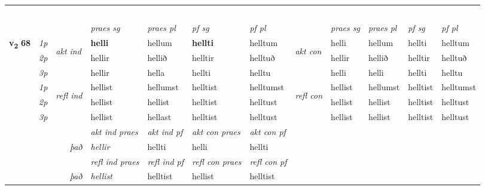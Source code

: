 \begin{longtable}[l]{X>{\footnotesize\itshape}llXXXXlXXXX}
\midrule
& \\*
   & \\*
  & \\*
   & \\*
  & \\
   \midrule
 & &   & \textit{praes sg}  & \textit{praes pl}    & \textit{ pf sg} & \textit{pf pl} & & \textit{praes sg}  & \textit{praes pl}    & \textit{pf sg} & \textit{pf pl }  \\ \cmidrule{4-7} \cmidrule{9-12}
 \multirow{2}{*}{{{\textbf{v{\textsubscript{2}}} \Large{\textbf{68}}}}}  & 1p & \multirow{3}{*}{\begin{turn}{90}\textit{akt ind}\end{turn}} & \textbf{helli} & hellum & \textbf{hellti} & helltum & \multirow{3}{*}{\begin{turn}{90}\textit{akt con}\end{turn}} &helli & hellum & hellti & helltum\\*
 & 2p &  &  hellir  & hellið & helltir & helltuð & & hellir & hellið & helltir & helltuð \\*
 & 3p &  & hellir & hella & hellti & helltu & & helli & helli& hellti & helltu \\*
\cmidrule{4-7} \cmidrule{9-12}
 & 1p & \multirow{3}{*}{\begin{turn}{90}\textit{refl ind}\end{turn}}  & hellist & hellumst & helltist & helltumst & \multirow{3}{*}{\begin{turn}{90}\textit{refl con}\end{turn}}  &hellist & hellumst & helltist & helltumst \\*
 & 2p &  & hellist & hellist & helltist & helltust & &hellist & hellist & helltist & helltust \\*
 & 3p  & & hellist & hellast & helltist & helltust & & hellist & hellist& helltist & helltust \\*
\cmidrule{4-7} \cmidrule{9-12}

   && &  \textit{akt ind praes} & \textit{akt ind pf} & \textit{akt con praes} & \textit{akt con pf} \\*
\multicolumn{3}{r}{\textit{það}} & hellir & hellti & helli & hellti \\*

\cmidrule{4-7}
 & && \textit{refl ind praes} & \textit{refl ind pf} & \textit{refl con praes} & \textit{refl con pf} \\*
\multicolumn{3}{r}{\textit{það}}& hellist & helltist & hellist & helltist \\*


\end{longtable}
